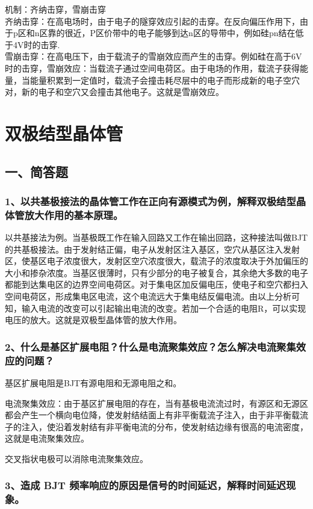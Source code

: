 \documentclass[cn,11pt]{elegantbook}
\begin{document}
机制：齐纳击穿，雪崩击穿\\
齐纳击穿：在高电场时，由于电子的隧穿效应引起的击穿。在反向偏压作用下，由于p区和n区靠的很近，P区价带中的电子能够到达n区的导带中，例如硅pn结在低于4V时的击穿.\\
雪崩击穿：在高电压下，由于载流子的雪崩效应而产生的击穿。例如硅在高于6V时的击穿，雪崩效应：当载流子通过空间电荷区。由于电场的作用，载流子获得能量，当能量积累到一定值时，载流子会撞击耗尽层中的电子而形成新的电子空穴对，新的电子和空穴又会撞击其他电子。这就是雪崩效应。


\section{双极结型晶体管}
\subsection*{一、简答题}
\subsubsection*{1、以共基极接法的晶体管工作在正向有源模式为例，解释双极结型晶体管放大作用的基本原理。}

以共基接法为例。当基极既工作在输入回路又工作在输出回路，这种接法叫做BJT的共基极接法。由于发射结正偏，电子从发射区注入基区，空穴从基区注入发射区，使基区电子浓度很大，发射区空穴浓度很大，载流子的浓度取决于外加偏压的大小和掺杂浓度。当基区很薄时，只有少部分的电子被复合，其余绝大多数的电子都能到达集电区的边界空间电荷区。对于集电区加反偏电压，使电子和空穴都扫入空间电荷区，形成集电区电流，这个电流远大于集电结反偏电流。由以上分析可知，输入电流的改变可以引起输出电流的改变。若加一个合适的电阻R，可以实现电压的放大。这就是双极型晶体管的放大作用。
\subsubsection*{2、什么是基区扩展电阻？什么是电流聚集效应？怎么解决电流聚集效应的问题？}

基区扩展电阻是BJT有源电阻和无源电阻之和。

电流聚集效应：由于基区扩展电阻的存在，当有基极电流流过时，有源区和无源区都会产生一个横向电位降，使发射结结面上有非平衡载流子注入，由于非平衡载流子的注入，使沿着发射结有非平衡电流的分布，使发射结边缘有很高的电流密度，这就是电流聚集效应。

交叉指状电极可以消除电流聚集效应。
\subsubsection*{3、造成 BJT 频率响应的原因是信号的时间延迟，解释时间延迟现象。}
\end{document}
